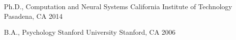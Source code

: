 
\begin{cventries}

  \cventry
    {Ph.D., Computation and Neural Systems}
    {California Institute of Technology}
    {Pasadena, CA}
    {2014}
    {}

  \cventry
    {B.A., Psychology}
    {Stanford University}
    {Stanford, CA}
    {2006}
    {}

\end{cventries}